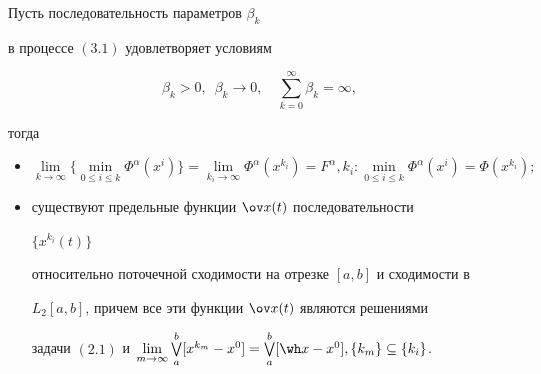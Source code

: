 \begin{thms}


Пусть последовательность параметров $ \beta_k$


в процессе $(3.1)$ удовлетворяет условиям


$$ \beta_k > 0,\ \;


\beta_k \to 0,\quad \sum_{k=0}^{\infty}\beta_k=\infty,


$$


тогда


\begin{itemize}


\item[a)] $\lim \limits_{k\to\infty} \big\{\min \limits_{0\le i\le k}


\Phi^\alpha(x^i)\big\}


= \lim \limits_{k_i\to\infty} \Phi^\alpha(x^{k_i})


= F^\alpha, k_i :


\min \limits_{0\le i\le k} \Phi^\alpha(x^i)=\Phi(x^{k_i});$


\item[б)] существуют предельные функции $\ov x(t)$ последовательности


$\{x^{k_i}(t)\}$


относительно поточечной сходимости на отрезке $[a, b]$ и сходимости в


$L_2[a,b]$, причем все эти функции $\ov x(t)$ являются решениями


задачи $(2.1)$ и $\lim \limits_{m \to \infty} \bigvee \limits_a^b


[x^{k_m}- x^0] = \bigvee \limits_a^b[\wh x- x^0], \{k_m\}\subseteq


\{k_i\}$.


\end{itemize}


\end{thms}





